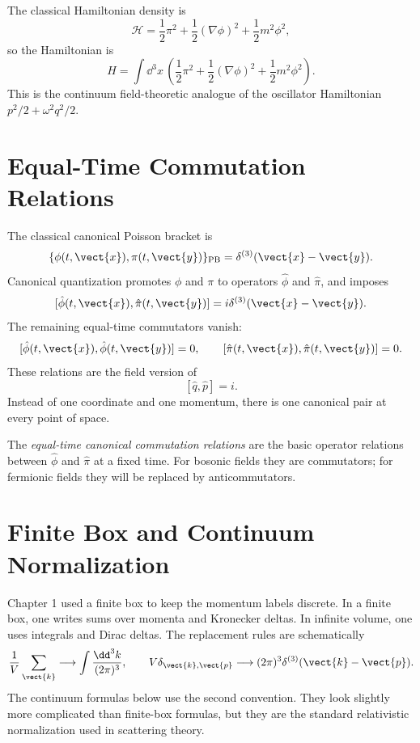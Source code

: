 The classical Hamiltonian density is
\[
    \mathcal{H}
    = \frac{1}{2}\pi^2
      + \frac{1}{2}(\nabla\phi)^2
      + \frac{1}{2}m^2\phi^2,
\]
so the Hamiltonian is
\[
    H
    = \int \dd^3x\,
    \left(
        \frac{1}{2}\pi^2
        + \frac{1}{2}(\nabla\phi)^2
        + \frac{1}{2}m^2\phi^2
    \right).
\]
This is the continuum field-theoretic analogue of the oscillator Hamiltonian
\(p^2/2+\omega^2q^2/2\).

\section{Equal-Time Commutation Relations}

The classical canonical Poisson bracket is
\[
    \{\phi(t,\vect{x}),\pi(t,\vect{y})\}_{\mathrm{PB}}
    = \delta^{(3)}(\vect{x}-\vect{y}).
\]
Canonical quantization promotes \(\phi\) and \(\pi\) to operators
\(\hat\phi\) and \(\hat\pi\), and imposes
\[
    [\hat\phi(t,\vect{x}),\hat\pi(t,\vect{y})]
    = i\delta^{(3)}(\vect{x}-\vect{y}).
\]
The remaining equal-time commutators vanish:
\[
    [\hat\phi(t,\vect{x}),\hat\phi(t,\vect{y})]=0,
    \qquad
    [\hat\pi(t,\vect{x}),\hat\pi(t,\vect{y})]=0.
\]
These relations are the field version of
\[
    [\hat q,\hat p]=i.
\]
Instead of one coordinate and one momentum, there is one canonical pair at every
point of space.

\begin{definitionbox}
The \emph{equal-time canonical commutation relations} are the basic operator
relations between \(\hat\phi\) and \(\hat\pi\) at a fixed time. For bosonic
fields they are commutators; for fermionic fields they will be replaced by
anticommutators.
\end{definitionbox}

\section{Finite Box and Continuum Normalization}

Chapter 1 used a finite box to keep the momentum labels discrete. In a finite
box, one writes sums over momenta and Kronecker deltas. In infinite volume, one
uses integrals and Dirac deltas. The replacement rules are schematically
\[
    \frac{1}{V}\sum_{\vect{k}}
    \longrightarrow
    \int\frac{\dd^3k}{(2\pi)^3},
    \qquad
    V\delta_{\vect{k},\vect{p}}
    \longrightarrow
    (2\pi)^3\delta^{(3)}(\vect{k}-\vect{p}).
\]
The continuum formulas below use the second convention. They look slightly more
complicated than finite-box formulas, but they are the standard relativistic
normalization used in scattering theory.

